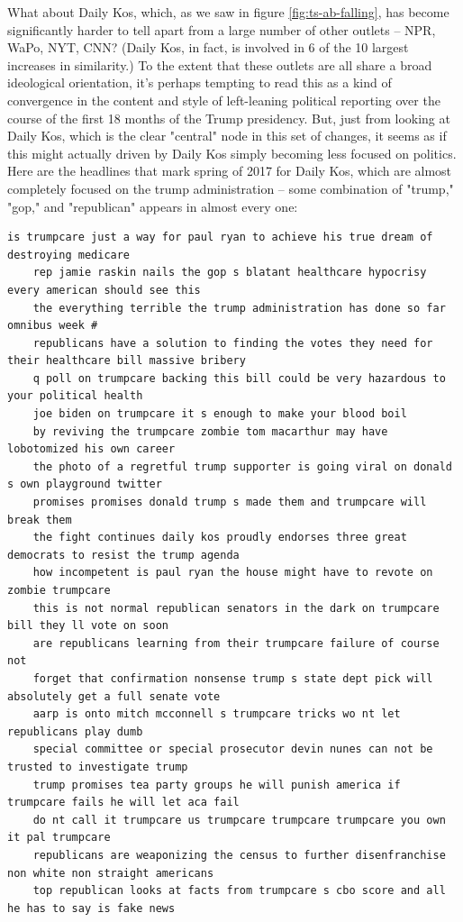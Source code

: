 \documentclass{scrartcl}
\begin{document}
What about Daily Kos, which, as we saw in figure \ref{fig:ts-ab-falling}, has become significantly harder to tell apart from a large number of other outlets -- NPR, WaPo, NYT, CNN? (Daily Kos, in fact, is involved in 6 of the 10 largest increases in similarity.) To the extent that these outlets are all share a broad ideological orientation, it's perhaps tempting to read this as a kind of convergence in the content and style of left-leaning political reporting over the course of the first 18 months of the Trump presidency. But, just from looking at Daily Kos, which is the clear "central" node in this set of changes, it seems as if this might actually driven by Daily Kos simply becoming less focused on politics. Here are the headlines that mark spring of 2017 for Daily Kos, which are almost completely focused on the trump administration -- some combination of "trump," "gop," and "republican" appears in almost every one:

\begin{lstlisting}[basicstyle=\tiny\hlfont]
    is trumpcare just a way for paul ryan to achieve his true dream of destroying medicare
    rep jamie raskin nails the gop s blatant healthcare hypocrisy every american should see this
    the everything terrible the trump administration has done so far omnibus week #
    republicans have a solution to finding the votes they need for their healthcare bill massive bribery
    q poll on trumpcare backing this bill could be very hazardous to your political health
    joe biden on trumpcare it s enough to make your blood boil
    by reviving the trumpcare zombie tom macarthur may have lobotomized his own career
    the photo of a regretful trump supporter is going viral on donald s own playground twitter
    promises promises donald trump s made them and trumpcare will break them
    the fight continues daily kos proudly endorses three great democrats to resist the trump agenda
    how incompetent is paul ryan the house might have to revote on zombie trumpcare
    this is not normal republican senators in the dark on trumpcare bill they ll vote on soon
    are republicans learning from their trumpcare failure of course not
    forget that confirmation nonsense trump s state dept pick will absolutely get a full senate vote
    aarp is onto mitch mcconnell s trumpcare tricks wo nt let republicans play dumb
    special committee or special prosecutor devin nunes can not be trusted to investigate trump
    trump promises tea party groups he will punish america if trumpcare fails he will let aca fail
    do nt call it trumpcare us trumpcare trumpcare trumpcare you own it pal trumpcare
    republicans are weaponizing the census to further disenfranchise non white non straight americans
    top republican looks at facts from trumpcare s cbo score and all he has to say is fake news
\end{lstlisting}
\end{document}
